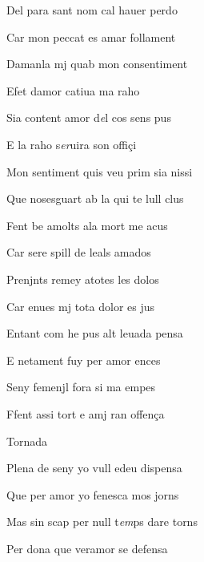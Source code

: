\documentclass[12pt]{article}
\begin{document}
\begin{estrofa}

 Del para sant nom cal hauer perdo

 Car mon peccat es amar follament

 Damanla mj quab mon consentiment

 Efet damor catiua ma raho

 Sia content amor d\textit{e}l cos sens pus

 E la raho s\textit{er}uira son offi\c{c}i

 Mon sentiment quis veu prim sia nissi

 Que nosesguart ab la qui te lull clus

\end{estrofa}



\begin{estrofa}

 Fent be amolts ala mort me acus

 Car sere spill de leals amados

 Prenjnts remey atotes les dolos

 Car enues mj tota dolor es jus

 Entant com he pus alt leuada pensa

 E netament fuy per amor ences

 Seny femenjl fora si ma empes

 Ffent assi tort e amj ran offen\c{c}a

\end{estrofa}


\begin{estrofaExtra}%




\begin{tornada}

Tornada

\end{tornada}


\end{estrofaExtra}


\begin{estrofa}

 Plena de seny yo vull edeu dispensa

 Que per amor yo fenesca mos jorns

 Mas sin scap per null t\textit{em}ps dare torns

 Per dona que veramor se defensa

\end{estrofa}
\end{document}
